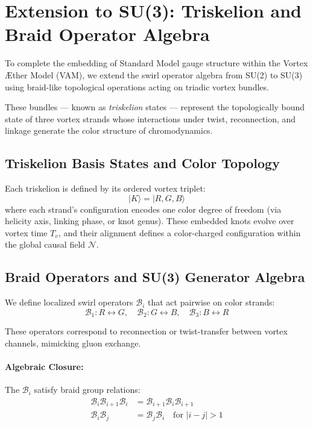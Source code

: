 \section{Extension to SU(3): Triskelion and Braid Operator Algebra}

To complete the embedding of Standard Model gauge structure within the Vortex \AE{}ther Model (VAM), we extend the swirl operator algebra from SU(2) to SU(3) using braid-like topological operations acting on triadic vortex bundles.

These bundles — known as \textit{triskelion} states — represent the topologically bound state of three vortex strands whose interactions under twist, reconnection, and linkage generate the color structure of chromodynamics.

\subsection*{Triskelion Basis States and Color Topology}

Each triskelion is defined by its ordered vortex triplet:
\[
|K\rangle = |R, G, B\rangle
\]
where each strand’s configuration encodes one color degree of freedom (via helicity axis, linking phase, or knot genus). These embedded knots evolve over vortex time \( T_v \), and their alignment defines a color-charged configuration within the global causal field \( \mathcal{N} \).

\subsection*{Braid Operators and SU(3) Generator Algebra}

We define localized swirl operators \( \mathcal{B}_i \) that act pairwise on color strands:
\[
\mathcal{B}_1 : R \leftrightarrow G, \quad
\mathcal{B}_2 : G \leftrightarrow B, \quad
\mathcal{B}_3 : B \leftrightarrow R
\]

These operators correspond to reconnection or twist-transfer between vortex channels, mimicking gluon exchange.

\paragraph{Algebraic Closure:}
The $\mathcal{B}_i$ satisfy braid group relations:
\begin{align}
\mathcal{B}_i \mathcal{B}_{i+1} \mathcal{B}_i &= \mathcal{B}_{i+1} \mathcal{B}_i \mathcal{B}_{i+1} \\
\mathcal{B}_i \mathcal{B}_j &= \mathcal{B}_j \mathcal{B}_i \quad \text{for } |i-j| > 1
\end{align}

